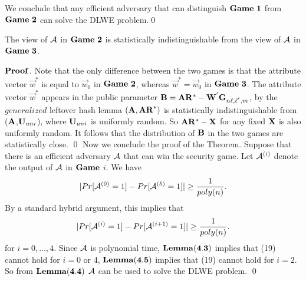 We conclude that any efficient adversary that can distinguish $\mathbf{Game\ 1}$ from $\mathbf{Game\ 2}$ can solve the DLWE problem.\qed
\begin{lemma}
The view of $\mathcal{A}$ in $\mathbf{Game\ 2}$ is statistically indistinguishable from the view of $\mathcal{A}$ in $\mathbf{Game\ 3}$.
\end{lemma}
\noindent $\mathbf{Proof}$. Note that the only difference between the two games is that the attribute vector $\vec{w}^{*}$ is equal to $\vec{w}_{0}$ in $\mathbf{Game\ 2}$, whereas $\vec{w}^{*}=\vec{w}_{0}$ in $\mathbf{Game\ 3}$. The attribute vector $\vec{w}^{*}$ appears in the public parameter $\mathbf{B}=\mathbf{A}\mathbf{R}^{*}-\mathbf{W}^{'}\mathbf{G}_{n\ell,\ell^{'},m}$, by the $generalized$ leftover hash lemma $(\mathbf{A},\mathbf{AR}^{*})$ is statistically indistinguishable from ($\mathbf{A}$,$\mathbf{U}_{uni}$), where $\mathbf{U}_{uni}$ is uniformly random. So $\mathbf{A}\mathbf{R}^{*}-\mathbf{X}$ for any fixed $\mathbf{X}$ is also uniformly random. It follows that the distribution of $\mathbf{B}$ in the two games are statistically close. \qed %
Now we conclude the proof of the Theorem. Suppose that there is an efficient adversary $\mathcal{A}$ that can win the security game. Let $\mathcal{A}^{(i)}$ denote the output of $\mathcal{A}$ in $\mathbf{Game}$ $i$. We have
\begin{equation}
|Pr[\mathcal{A}^{(0)}=1]-Pr[\mathcal{A}^{(5)}=1]|\geq\frac{1}{poly(n)}.
\end{equation}
By a standard hybrid argument, this implies that
\begin{equation}
|Pr[\mathcal{A}^{(i)}=1]-Pr[\mathcal{A}^{(i+1)}=1]|\geq\frac{1}{poly(n)}.
\end{equation}
for $i=0,...,4$. Since $\mathcal{A}$ is polynomial time, $\mathbf{Lemma(4.3)}$ implies that (19) cannot hold for $i=0$ or 4, $\mathbf{Lemma(4.5)}$ implies that (19) cannot hold for $i=2$. So from $\mathbf{Lemma(4.4)}$ $\mathcal{A}$ can be used to solve the DLWE problem. \qed


